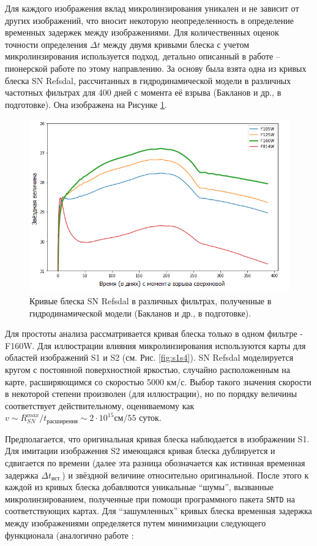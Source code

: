 Для каждого изображения вклад микролинзирования уникален и не зависит от других изображений, что вносит некоторую неопределенность в определение временных задержек между изображениями. Для количественных оценок точности определения $\Delta t$ между двумя кривыми блеска с учетом микролинзирования используется подход, детально описанный в работе \cite{doblerkeeton2006} -- пионерской работе по этому направлению. За основу была взята одна из кривых блеска SN Refsdal, рассчитанных в гидродинамической модели в различных частотных фильтрах для 400 дней с момента её взрыва (Бакланов и др., в подготовке). Она изображена на Рисунке \ref{fig:lightcurves}. 

\begin{figure}[H]
    \centering
	\includegraphics[scale=0.68]{pics/lightcurves.png}
	\caption{Кривые блеска SN Refsdal в различных фильтрах, полученные в гидродинамической модели (Бакланов и др., в подготовке). \label{fig:lightcurves}} 
\end{figure}

Для простоты анализа рассматривается кривая блеска только в одном фильтре - F160W. Для иллюстрации влияния микролинзирования используются карты для областей изображений S1 и S2 (см. Рис. \ref{fig:s1s4}). SN Refsdal моделируется кругом с постоянной поверхностной яркостью, случайно расположенным на карте, расширяющимся со скоростью 5000 км/с. Выбор такого значения скорости в некоторой степени произволен (для иллюстрации), но по порядку величины соответствует действительному, оцениваемому как $v \sim {R_{SN}^{max}}/{t_{\textrm{расширения}}} \sim {2 \cdot 10^{15} \textrm{см} }/{55 \textrm{ суток}}$.

Предполагается, что оригинальная кривая блеска наблюдается в изображении S1. Для имитации изображения S2 имеющаяся кривая блеска дублируется и сдвигается по времени (далее эта разница обозначается как истинная временная задержка $\Delta t_{\textrm{ист.}}$) и звёздной величине относительно оригинальной. После этого к каждой из кривых блеска добавляются уникальные “шумы”, вызванные микролинзированием, полученные при помощи программного пакета {\tt{SNTD}} на соответствующих картах. Для “зашумленных” кривых блеска временная задержка между изображениями определяется путем минимизации следующего функционала (аналогично работе \cite{doblerkeeton2006}:

